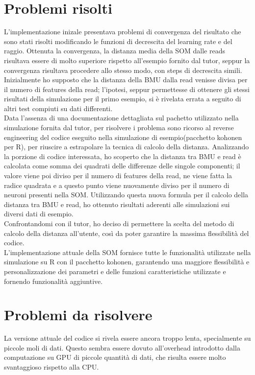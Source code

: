 \section{Problemi risolti}
L'implementazione inizale presentava problemi di convergenza del risultato che sono stati risolti modificando le funzioni di decrescita del learning rate e del raggio. Ottenuta la convergenza, la distanza media della SOM dalle reads risultava essere di molto superiore rispetto all'esempio fornito dal tutor, seppur la convergenza risultava procedere allo stesso modo, con steps di decrescita simili.\\
Inizialmente ho supposto che la distanza della BMU dalla read venisse divisa per il numero di features della read; l'ipotesi, seppur permettesse di ottenere gli stessi risultati della simulazione per il primo esempio, si è rivelata errata a seguito di altri test compiuti su dati differenti.\\
Data l'assenza di una documentazione dettagliata sul pachetto utilizzato nella simulazione fornita dal tutor, per risolvere i problema sono ricorso al reverse engineering del codice eseguito nella simulazione di esempio(pacchetto kohonen per R), per riuscire a estrapolare la tecnica di calcolo della distanza. Analizzando la porzione di codice interessata, ho scoperto che la distanza tra BMU e read è calcolata come somma dei quadrati delle differenze delle singole componenti; il valore viene poi diviso per il numero di features della read, ne viene fatta la radice quadrata e a questo punto viene nuovamente diviso per il numero di neuroni presenti nella SOM. Utilizzando questa nuova formula per il calcolo della distanza tra BMU e read, ho ottenuto risultati aderenti alle simulazioni sui diversi dati di esempio.\\
Confrontandomi con il tutor, ho deciso di permettere la scelta del metodo di calcolo della distanza all'utente, così da poter garantire la massima flessibilità del codice.\\
L'implementazione attuale della SOM fornisce tutte le funzionalità utilizzate nella simulazione su R con il pacchetto kohonen, garantendo una maggiore flessibilità e personalizzazione dei parametri e delle funzioni caratteristiche utilizzate e fornendo funzionalità aggiuntive.\\

\section{Problemi da risolvere}
La versione attuale del codice si rivela essere ancora troppo lenta, specialmente su piccole moli di dati. Questo sembra essere dovuto all'overhead introdotto dalla computazione su GPU di piccole quantità di dati, che risulta essere molto svantaggioso rispetto alla CPU.

